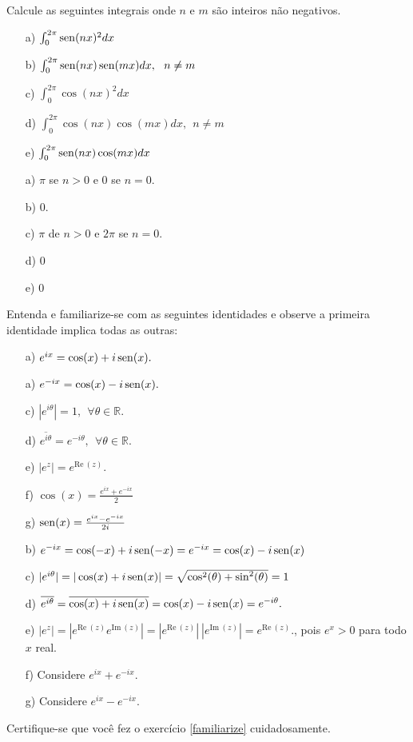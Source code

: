 \begin{Exercise}Calcule as seguintes integrais onde $n$ e $m$ são inteiros não negativos.
\begin{itemize}
\item [a)] $\int_0^{2\pi}\operatorname{sen}(nx)^2dx$
\item [b)] $\int_0^{2\pi}\operatorname{sen}(nx)\operatorname{sen}(mx)dx,~~n\neq m$
\item [c)] $\int_0^{2\pi}\cos(nx)^2dx$
\item [d)] $\int_0^{2\pi}\cos(nx)\cos(mx)dx,~~n\neq m$
\item [e)] $\int_0^{2\pi}\operatorname{sen}(nx)\cos(mx)dx$
\end{itemize}
\end{Exercise}
\begin{Answer}
\begin{itemize}
\item [a)] $\pi$ se $n>0$ e $0$ se $n=0$.
\item [b)] $0$.
\item [c)] $\pi$ de $n>0$ e $2\pi$ se $n=0$.
\item [d)] $0$
\item [e)] $0$
\end{itemize}
\end{Answer}
\begin{Exercise}\label{familiarize} Entenda e familiarize-se com as seguintes identidades e observe a primeira identidade implica todas as outras:
\begin{itemize}
 \item [a)] $e^{ix}=\cos(x)+i\operatorname{sen}(x).$
 \item [a)] $e^{-ix}=\cos(x)-i\operatorname{sen}(x).$
 \item [c)] $|e^{i\theta}|=1, ~~ \forall \theta\in\mathbb{R}.$
 \item [d)] $\overline{e^{i\theta}}=e^{-i\theta}, ~~ \forall \theta\in\mathbb{R}.$
 \item [e)] $|e^{z}|=e^{\text{Re}~\!( z)}.$
 \item [f)] $\cos(x)=\frac{e^{ix}+e^{-ix}}{2}$
 \item [g)] $\operatorname{sen}(x)=\frac{e^{ix}-e^{-ix}}{2i}$
 \end{itemize}
\end{Exercise}
\begin{Answer}
 \begin{itemize}
 \item [b)] $e^{-ix}=\cos(-x)+i\operatorname{sen}(-x)=e^{-ix}=\cos(x)-i\operatorname{sen}(x)$
 \item [c)] $|e^{i\theta}|=|\cos(x)+i\operatorname{sen}(x)|= \sqrt{\cos^2(\theta)+\sin^2(\theta)}=1$
 \item [d)] $\overline{e^{i\theta}}=\overline{\cos(x)+i\operatorname{sen}(x)}=\cos(x)-i\operatorname{sen}(x)=e^{-i\theta}.$
 \item [e)] $|e^{z}|=|e^{\text{Re}~\!( z)}e^{\text{Im}~\!( z)}|=|e^{\text{Re}~\!( z)}|~|e^{\text{Im}~\!( z)}|=e^{\text{Re}~\!( z)}.$, pois $e^x>0$ para todo $x$ real.
 \item [f)] Considere $e^{ix}+e^{-ix}$.
 \item [g)] Considere $e^{ix}-e^{-ix}$.
 \end{itemize}
\end{Answer}
\begin{Exercise} Certifique-se que você fez o exercício \ref{familiarize} cuidadosamente.
\end{Exercise}
